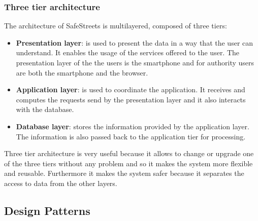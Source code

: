             \subsubsection{Three tier architecture}
            The architecture of SafeStreets is multilayered, composed of three tiers:
            \begin{itemize}
                \item \textbf{Presentation layer}: is used to present the data in a way
                that the user can understand. It enables the usage of the services
                offered to the user. The presentation layer of the the users is the
                smartphone and for authority users are both the smartphone and the
                browser.
                \item \textbf{Application layer}: is used to coordinate the application.
                It receives and computes the requests send by the presentation layer and
                it also interacts with the database.
                \item \textbf{Database layer}: stores the information provided by the
                application layer. The information is also passed back to the
                application tier for processing.
            \end{itemize}    
            Three tier architecture is very useful because it allows to change or
            upgrade one of the three tiers without any problem and so it makes the
            system more flexible and reusable. Furthermore it makes the system safer
            because it separates the access to data from the other layers.
                

        \subsection{Design Patterns}
